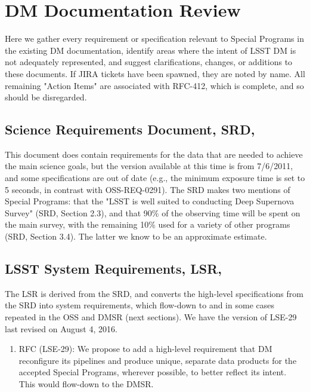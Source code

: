 
\section{DM Documentation Review}\label{sec:docrev}

Here we gather every requirement or specification relevant to Special Programs in the existing DM documentation, identify areas where the intent of LSST DM is not adequately represented, and suggest clarifications, changes, or additions to these documents. If JIRA tickets have been spawned, they are noted by name. All remaining "Action Items" are associated with RFC-412, which is complete, and so should be disregarded. 

\subsection{Science Requirements Document, SRD, }\label{ssec:docrev_srd}

This document does contain requirements for the data that are needed to achieve the main science goals, but the version available at this time is from 7/6/2011, and some specifications are out of date (e.g., the minimum exposure time is set to 5 seconds, in contrast with OSS-REQ-0291). The SRD makes two mentions of Special Programs: that the "LSST is well suited to conducting Deep Supernova Survey" (SRD, Section 2.3), and that 90\% of the observing time will be spent on the main survey, with the remaining 10\% used for a variety of other programs (SRD, Section 3.4). The latter we know to be an approximate estimate.

\subsection{LSST System Requirements, LSR, }\label{ssec:docrev_lsr}

The LSR is derived from the SRD, and converts the high-level specifications from the SRD into system requirements, which flow-down to and in some cases repeated in the OSS and DMSR (next sections). We have the version of LSE-29 last revised on August 4, 2016.

\begin{enumerate}[resume,topsep=-10pt,after=\vspace{10pt},label= \textbf{Action \Roman*}] \item \label{LSR-0} RFC (LSE-29): We propose to add a high-level requirement that DM reconfigure its pipelines and produce unique, separate data products for the accepted Special Programs, wherever possible, to better reflect its intent. This would flow-down to the DMSR. \end{enumerate}

